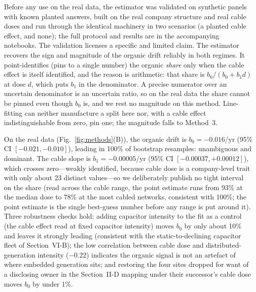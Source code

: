 \documentclass[journal]{IEEEtran}
\begin{document}
Before any use on the real data, the estimator was validated on synthetic panels
with known planted answers, built on the real company structure and real cable
doses and run through the identical machinery in two scenarios (a planted cable
effect, and none); the full protocol and results are in the accompanying
notebooks. The validation licenses a specific and limited claim. The estimator
recovers the sign and magnitude of the organic drift reliably in both regimes.
It point-identifies (pins to a single number) the organic \emph{share} only when
the cable effect is itself identified, and the reason is arithmetic: that share
is $b_0/(b_0+b_1 d)$ at dose $d$, which puts $b_1$ in the denominator. A precise
numerator over an uncertain denominator is an uncertain ratio, so on the real
data the share cannot be pinned even though $b_0$ is, and we rest no magnitude on
this method. Line-fitting can neither manufacture a split here nor, with a cable
effect indistinguishable from zero, pin one; the magnitude falls to Method~3.

On the real data (Fig.~\ref{fig:methods}(B)), the organic drift is $b_0=-0.016$/yr
(95\% CI $[-0.021,-0.010]$), leading in 100\% of bootstrap resamples: unambiguous
and dominant. The cable slope is $b_1=-0.00005$/yr (95\% CI
$[-0.00037,+0.00012]$), which crosses zero---weakly identified, because cable dose
is a company-level trait with only about 23 distinct values---so we deliberately
publish no tight interval on the share (read across the cable range, the point
estimate runs from 93\% at the median dose to 78\% at the most cabled networks,
consistent with 100\%; the point estimate is the single best-guess number
before any range is put around it). Three robustness checks hold: adding capacitor intensity
to the fit as a control (the cable effect read at fixed capacitor intensity)
moves $b_0$ by only about 10\% and leaves it strongly leading
(consistent with the static-to-declining capacitor fleet of Section~VI-B); the
low correlation between cable dose and distributed-generation intensity ($-0.22$)
indicates the organic signal is not an artefact of where embedded generation
sits; and restoring the four sites dropped for want of a disclosing owner in
the Section~II-D mapping under their successor's cable dose moves $b_0$ by
under 1\%.
\end{document}

